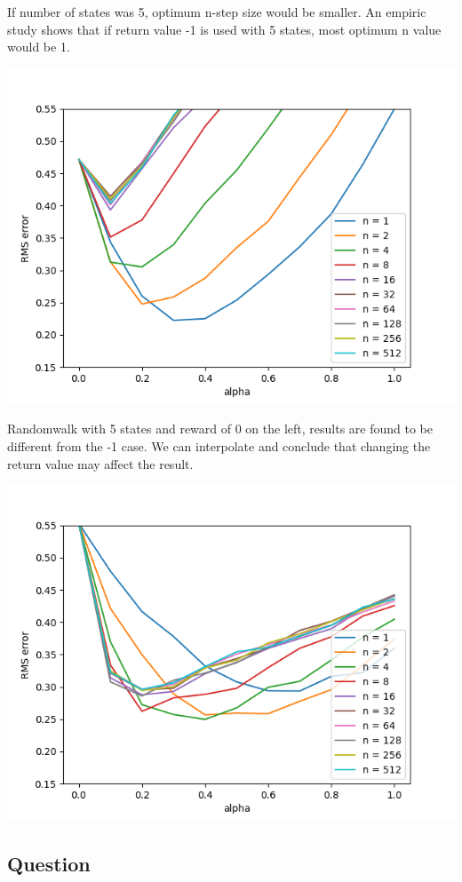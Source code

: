 \documentclass[11pt]{article}
\begin{document}
    If number of states was 5, optimum n-step size would be smaller.
    An empiric study shows that if return value -1 is used with 5 states, most optimum n value would be 1.

    \includegraphics[scale=0.4]{figure_7_3_5states_ret-1}

    Randomwalk with 5 states and reward of 0 on the left, results are found to be different from the -1 case.
    We can interpolate and conclude that changing the return value may affect the result.

    \includegraphics[scale=0.4]{figure_7_3_5states_ret0}

    \subsection{Question}
\end{document}
